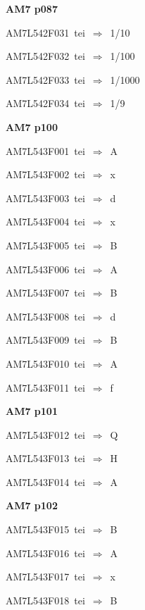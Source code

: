\par\vfill\eject
{\bf\hfill AM7 p087\hfill\hbox{}}\par\bigskip
{\sixrm AM7L542F031\ {\sixit tei}\ }$\Rightarrow$\ 1/10\par\smallskip
{\sixrm AM7L542F032\ {\sixit tei}\ }$\Rightarrow$\ 1/100\par\smallskip
{\sixrm AM7L542F033\ {\sixit tei}\ }$\Rightarrow$\ 1/1000\par\smallskip
{\sixrm AM7L542F034\ {\sixit tei}\ }$\Rightarrow$\ 1/9\par\smallskip

\par\vfill\eject
{\bf\hfill AM7 p100\hfill\hbox{}}\par\bigskip
{\sixrm AM7L543F001\ {\sixit tei}\ }$\Rightarrow$\ A\par\smallskip
{\sixrm AM7L543F002\ {\sixit tei}\ }$\Rightarrow$\ {\tenit x}\par\smallskip
{\sixrm AM7L543F003\ {\sixit tei}\ }$\Rightarrow$\ {\tenit d}\par\smallskip
{\sixrm AM7L543F004\ {\sixit tei}\ }$\Rightarrow$\ {\tenit x}\par\smallskip
{\sixrm AM7L543F005\ {\sixit tei}\ }$\Rightarrow$\ B\par\smallskip
{\sixrm AM7L543F006\ {\sixit tei}\ }$\Rightarrow$\ A\par\smallskip
{\sixrm AM7L543F007\ {\sixit tei}\ }$\Rightarrow$\ B\par\smallskip
{\sixrm AM7L543F008\ {\sixit tei}\ }$\Rightarrow$\ {\tenit d}\par\smallskip
{\sixrm AM7L543F009\ {\sixit tei}\ }$\Rightarrow$\ B\par\smallskip
{\sixrm AM7L543F010\ {\sixit tei}\ }$\Rightarrow$\ A\par\smallskip
{\sixrm AM7L543F011\ {\sixit tei}\ }$\Rightarrow$\ {\tenit f}\par\smallskip

\par\vfill\eject
{\bf\hfill AM7 p101\hfill\hbox{}}\par\bigskip
{\sixrm AM7L543F012\ {\sixit tei}\ }$\Rightarrow$\ Q\par\smallskip
{\sixrm AM7L543F013\ {\sixit tei}\ }$\Rightarrow$\ H\par\smallskip
{\sixrm AM7L543F014\ {\sixit tei}\ }$\Rightarrow$\ A\par\smallskip

\par\vfill\eject
{\bf\hfill AM7 p102\hfill\hbox{}}\par\bigskip
{\sixrm AM7L543F015\ {\sixit tei}\ }$\Rightarrow$\ B\par\smallskip
{\sixrm AM7L543F016\ {\sixit tei}\ }$\Rightarrow$\ A\par\smallskip
{\sixrm AM7L543F017\ {\sixit tei}\ }$\Rightarrow$\ {\tenit x}\par\smallskip
{\sixrm AM7L543F018\ {\sixit tei}\ }$\Rightarrow$\ B\par\smallskip

